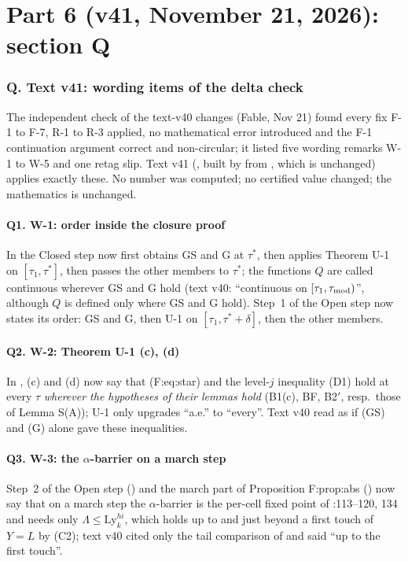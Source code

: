 \part*{Part 6 (v41, November 21, 2026): section Q}
\section*{Q. Text v41: wording items of the delta check }
The independent check of the text-v40 changes (Fable, Nov 21) found every fix F-1 to F-7, R-1 to R-3 applied, no mathematical error introduced and the F-1 continuation argument correct and non-circular; it listed five wording remarks W-1 to W-5 and one retag slip. Text v41 (, built by  from , which is unchanged) applies exactly these. No number was computed; no certified value changed; the mathematics is unchanged.
\subsection*{Q1. W-1: order inside the closure proof}
In  the Closed step now first obtains GS and G at $\tau^*$, then applies Theorem U-1 on $[\tau_1,\tau^*]$, then passes the other members to $\tau^*$; the functions $Q$ are called continuous wherever GS and G hold (text v40: ``continuous on $[\tau_1,\tau_{\rm mod})$'', although $Q$ is defined only where GS and G hold). Step~1 of the Open step now states its order: GS and G, then U-1 on $[\tau_1,\tau^*+\delta]$, then the other members.
\subsection*{Q2. W-2: Theorem U-1 (c), (d)}
In , (c) and (d) now say that (F:eq:star) and the level-$j$ inequality (D1) hold at every $\tau$ \emph{wherever the hypotheses of their lemmas hold} (B1(c), BF, B2$'$, resp.\ those of Lemma S(A)); U-1 only upgrades ``a.e.'' to ``every''. Text v40 read as if (GS) and (G) alone gave these inequalities.
\subsection*{Q3. W-3: the $\alpha$-barrier on a march step}
Step~2 of the Open step () and the march part of Proposition F:prop:abs () now say that on a march step the $\alpha$-barrier is the per-cell fixed point of :113--120, 134 and needs only $\Lambda\le\mathrm{Ly}^{hi}_k$, which holds up to and just beyond a first touch of $Y=L$ by (C2); text v40 cited only the tail comparison of  and said ``up to the first touch''.
